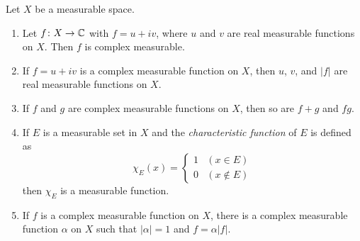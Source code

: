 \begin{proposition}
Let $X$ be a measurable space.
\begin{enumerate}[label=(\roman*)]
\item Let $f\colon X\to\mathbb C$ with $f=u+iv$, where $u$ and $v$ are real measurable functions on $X$. Then $f$ is complex measurable.

\item If $f=u+iv$ is a complex measurable function on $X$, then $u$, $v$, and $|f|$ are real measurable functions on $X$.

\item If $f$ and $g$ are complex measurable functions on $X$, then so are $f+g$ and $fg$.

\item If $E$ is a measurable set in $X$ and the \emph{characteristic function} of $E$ is defined as
\[\chi_E(x)=\begin{cases}
1&(x\in E)\\
0&(x\notin E)
\end{cases}\]
then $\chi_E$ is a measurable function.

\item If $f$ is a complex measurable function on $X$, there is a complex measurable function $\alpha$ on $X$ such that $|\alpha|=1$ and $f=\alpha|f|$. 
\end{enumerate}
\end{proposition}

